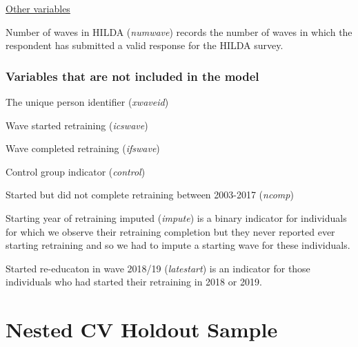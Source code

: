 \documentclass[12pt, a4paper]{article}
\begin{document}
\underline{Other variables}

Number of waves in HILDA (\textit{numwave}) records the number of waves in which the respondent has submitted a valid response for the HILDA survey. 

\subsubsection{Variables that are not included in the model}

The unique person identifier (\textit{xwaveid})

Wave started retraining (\textit{icswave}) 

Wave completed retraining (\textit{ifswave}) 

Control group indicator (\textit{control}) 

Started but did not complete retraining between 2003-2017 (\textit{ncomp}) 

Starting year of retraining imputed (\textit{impute}) is a binary indicator for individuals for which we observe their retraining completion but they never reported ever starting retraining and so we had to impute a starting wave for these individuals.  

Started re-educaton in wave 2018/19 (\textit{latestart}) is an indicator for those individuals who had started their retraining in 2018 or 2019. 


\section{Nested CV Holdout Sample}
\label{app:cv}
\end{document}
